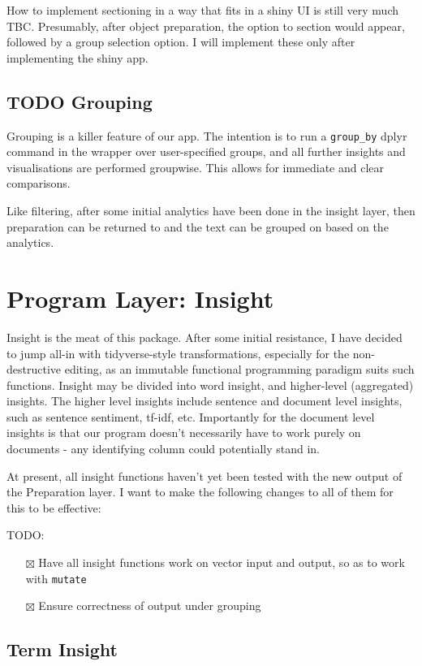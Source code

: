 \documentclass[a4paper, 11pt]{article}
\begin{document}
How to implement sectioning in a way that fits in a shiny UI is still
very much TBC. Presumably, after object preparation, the option to
section would appear, followed by a group selection option. I will
implement these only after implementing the shiny app.
\subsection{{\bfseries\sffamily TODO} Grouping}
\label{sec:org8c9371e}
Grouping is a killer feature of our app. The intention is to run a
\texttt{group\_by} dplyr command in the wrapper over user-specified groups,
and all further insights and visualisations are performed groupwise.
This allows for immediate and clear comparisons.

Like filtering, after some initial analytics have been done in the
insight layer, then preparation can be returned to and the text can be
grouped on based on the analytics.
\section{Program Layer: Insight}
\label{sec:org4cf0bb6}
Insight is the meat of this package. After some initial resistance, I
have decided to jump all-in with tidyverse-style transformations,
especially for the non-destructive editing, as an immutable functional
programming paradigm suits such functions. Insight may be divided into
word insight, and higher-level (aggregated) insights. The higher level
insights include sentence and document level insights, such as
sentence sentiment, tf-idf, etc. Importantly for the document level
insights is that our program doesn't necessarily have to work purely
on documents - any identifying column could potentially stand in.

At present, all insight functions haven't yet been tested with the new
output of the Preparation layer. I want to make the following changes
to all of them for this to be effective:

TODO:
\begin{itemize}
\item[{$\boxtimes$}] Have all insight functions work on vector input and output, so
as to work with \texttt{mutate}
\item[{$\boxtimes$}] Ensure correctness of output under grouping
\end{itemize}
\subsection{Term Insight}
\label{sec:orgb62f7ec}
\end{document}
